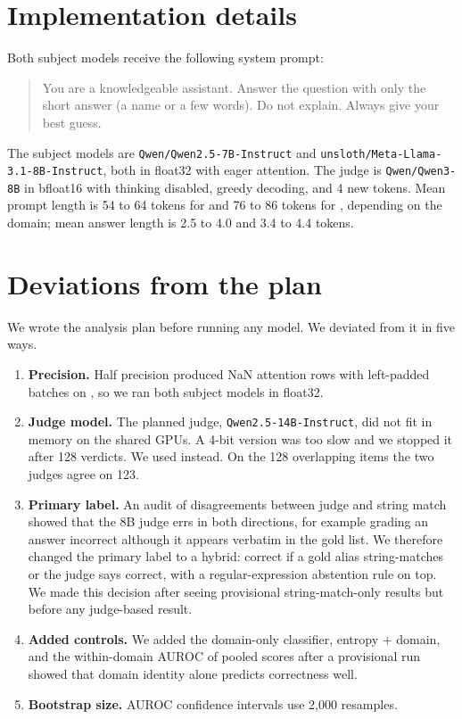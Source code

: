 \section{Implementation details}
\label{app:details}

Both subject models receive the following system prompt:
\begin{quote}
\small
You are a knowledgeable assistant. Answer the question with only the short answer (a name or a few words). Do not explain. Always give your best guess.
\end{quote}

The subject models are \texttt{Qwen/Qwen2.5-7B-Instruct} and \texttt{unsloth/Meta-Llama-3.1-8B-Instruct}, both in float32 with eager attention.
The judge is \texttt{Qwen/Qwen3-8B} in bfloat16 with thinking disabled, greedy decoding, and 4 new tokens.
Mean prompt length is 54 to 64 tokens for \qwen and 76 to 86 tokens for \llama, depending on the domain; mean answer length is 2.5 to 4.0 and 3.4 to 4.4 tokens.

\section{Deviations from the plan}
\label{app:deviations}

We wrote the analysis plan before running any model. We deviated from it in five ways.
\begin{enumerate}[leftmargin=*,itemsep=0pt,topsep=0pt]
    \item \textbf{Precision.} Half precision produced NaN attention rows with left-padded batches on \qwen, so we ran both subject models in float32.
    \item \textbf{Judge model.} The planned judge, \texttt{Qwen2.5-14B-Instruct}, did not fit in memory on the shared GPUs. A 4-bit version was too slow and we stopped it after 128 verdicts. We used \judge instead. On the 128 overlapping items the two judges agree on 123.
    \item \textbf{Primary label.} An audit of disagreements between judge and string match showed that the 8B judge errs in both directions, for example grading an answer incorrect although it appears verbatim in the gold list. We therefore changed the primary label to a hybrid: correct if a gold alias string-matches or the judge says correct, with a regular-expression abstention rule on top. We made this decision after seeing provisional string-match-only results but before any judge-based result.
    \item \textbf{Added controls.} We added the domain-only classifier, entropy + domain, and the within-domain AUROC of pooled scores after a provisional run showed that domain identity alone predicts correctness well.
    \item \textbf{Bootstrap size.} AUROC confidence intervals use 2,000 resamples.
\end{enumerate}

